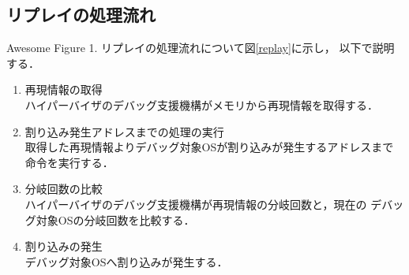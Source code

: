 \documentclass[tanilab-enum]{graduate}
\begin{document}
    \subsection{リプレイの処理流れ}
    {Awesome Figure 1.} 
    リプレイの処理流れについて図\ref{replay}に示し，
    以下で説明する．
            \begin{enumerate}
                \item 再現情報の取得\\
                    ハイパーバイザのデバッグ支援機構がメモリから再現情報を取得する．
                \item 割り込み発生アドレスまでの処理の実行\\
                    取得した再現情報よりデバッグ対象OSが割り込みが発生するアドレスまで
                    命令を実行する．
                \item 分岐回数の比較\\
                    ハイパーバイザのデバッグ支援機構が再現情報の分岐回数と，現在の
                    デバッグ対象OSの分岐回数を比較する．
                \item 割り込みの発生\\
                    デバッグ対象OSへ割り込みが発生する．
            \end{enumerate}
        
\end{document}
